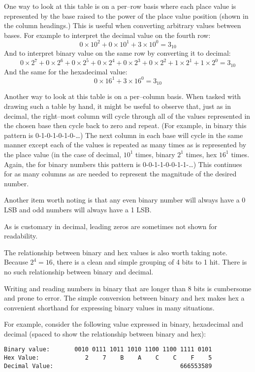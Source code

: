One way to look at this table is on a per--row basis where each place 
value is represented by the base raised to the power of the place value
position (shown in the column headings.)  This is useful when
converting arbitrary values between bases.  For example to interpret
the decimal value on the fourth row: 
\[ 0 \times 10^2 + 0 \times 10^1 + 3 \times 10^0 = 3_{10} \]
And to interpret binary value on the same row by converting it to decimal:
\[ 0 \times 2^7 + 0 \times 2^6 +0 \times 2^5 +0 \times 2^4 +0 \times 2^3 +0 \times 2^2 + 1 \times 2^1 + 1 \times 2^0 = 3_{10} \]
And the same for the hexadecimal value:
\[ 0 \times 16^1 + 3 \times 16^0 = 3_{10} \]


Another way to look at this table is on a per--column basis.  When
tasked with drawing such a table by hand, it might be useful 
to observe that, just as in decimal, the right--most column will
cycle through all of the values represented in the chosen base
then cycle back to zero and repeat.  (For example, in binary this
pattern is 0-1-0-1-0-1-0-\ldots) The next column in each base
will cycle in the same manner except each of the values is repeated
as many times as is represented by the place value (in the case of 
decimal, $10^1$ times, binary $2^1$ times, hex $16^1$ times.  Again,
the for binary numbers this pattern is  0-0-1-1-0-0-1-1-\ldots)
This continues for as many columns as are needed to represent the 
magnitude of the desired number.

Another item worth noting is that any even binary number will always
have a 0 LSB and odd numbers will always have a 1 LSB.

As is customary in decimal, leading zeros are sometimes not shown 
for readability.

The relationship between binary and hex values is also worth taking
note.  Because $2^4 = 16$, there is a clean and simple grouping
of 4 \gls{bit}s to 1 \gls{hit}.  There is no such relationship
between binary and decimal.  

Writing and reading numbers in binary that are longer than 8 bits 
is cumbersome and prone to error.  The simple conversion between 
binary and hex makes hex a convenient shorthand for expressing 
binary values in many situations.  

For example, consider the following value expressed in binary, 
hexadecimal and decimal (spaced to show the relationship
between binary and hex):

\begin{verbatim}
Binary value:       0010 0111 1011 1010 1100 1100 1111 0101
Hex Value:             2    7    B    A    C    C    F    5
Decimal Value:                                    666553589
\end{verbatim}

